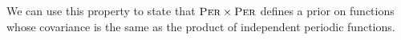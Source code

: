 \documentclass{article}
\def\ie{i.e.\ }
\begin{document}
We can use this property to state that ${\textsc{Per}} \times {\textsc{Per}}$ defines a prior on functions whose covariance is the same as the product of independent periodic functions.







\end{document}
